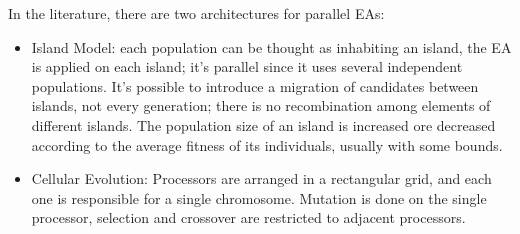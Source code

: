 In the literature, there are two architectures for parallel EAs:
\begin{itemize}
	\item Island Model: each population can be thought as inhabiting an island, the EA is applied on each island; it's parallel since it uses several independent populations. It's possible to introduce a migration of candidates between islands, not every generation; there is no recombination among elements of different islands. The population size of an island is increased ore decreased according to the average fitness of its individuals, usually with some bounds.
	\item Cellular Evolution: Processors are arranged in a rectangular grid, and each one is responsible for a single chromosome. Mutation is done on the single processor, selection and crossover are restricted to adjacent processors.
\end{itemize}
